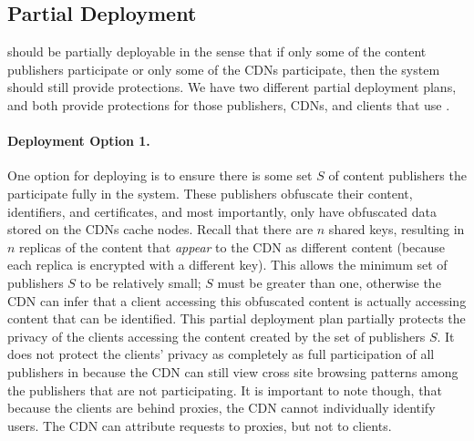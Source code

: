 \subsection{Partial Deployment}
\label{sec:partial}
\system{} should be partially deployable in the sense that if only some of the content publishers participate or only some of the CDNs participate, then 
the system should still provide protections.  We have two different partial deployment plans, and both provide protections for those 
publishers, CDNs, and clients that use \system{}. 

\paragraph{Deployment Option 1.}
One option for deploying \system{} is to ensure there is some set $S$ of content publishers the participate fully in the 
system.  These publishers obfuscate their content, identifiers, and certificates, and most importantly, only have 
obfuscated data stored on the CDNs cache nodes.  Recall that there are $n$ shared keys, resulting in $n$ replicas of the 
content that {\it appear} to the CDN as different content (because each replica is encrypted with a different key).  This 
allows the minimum set of publishers $S$ to be relatively small; $S$ must be greater than one, otherwise the CDN can infer 
that a client accessing this obfuscated content is actually accessing content that can be identified.  This partial deployment plan 
partially protects the privacy of the clients accessing the content created by the set of publishers $S$.  It does not 
protect the clients' privacy as completely as full participation of all publishers in \system{} because the CDN can 
still view cross site browsing patterns among the publishers that are not participating. It is important to note though, that 
because the clients are behind proxies, the CDN cannot individually identify users.  The CDN can attribute requests to proxies, but 
not to clients.  

